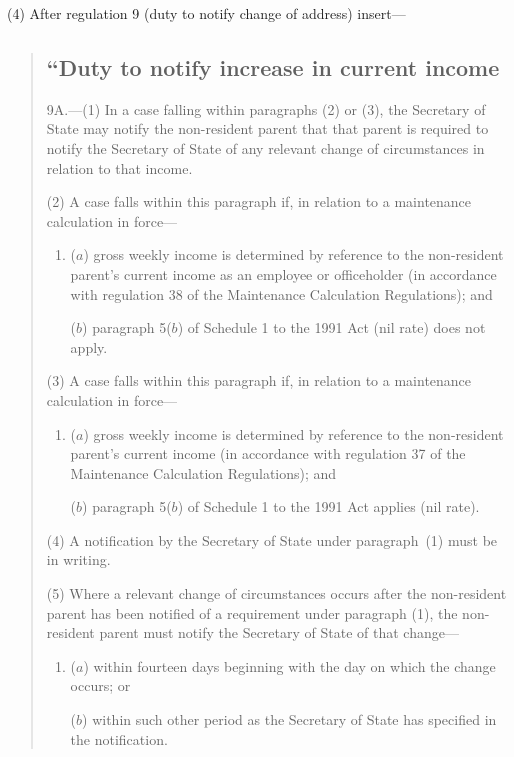 \documentclass[12pt,a4paper]{article}
\begin{document}
(4) After regulation 9 (duty to notify change of address) insert—
\begin{quotation}
\subsection*{“Duty to notify increase in current income}

9A.---(1)  In a case falling within paragraphs (2) or (3), the Secretary of State may notify the non-resident parent that that parent is required to notify the Secretary of State of any relevant change of circumstances in relation to that income.

(2) A case falls within this paragraph if, in relation to a maintenance calculation in force—
\begin{enumerate}\item[]
($a$) gross weekly income is determined by reference to the non-resident parent’s current income as an employee or officeholder (in accordance with regulation 38 of the Maintenance Calculation Regulations); and

($b$) paragraph 5($b$)  of Schedule 1 to the 1991 Act (nil rate) does not apply.
\end{enumerate}

(3) A case falls within this paragraph if, in relation to a maintenance calculation in force—
\begin{enumerate}\item[]
($a$) gross weekly income is determined by reference to the non-resident parent’s current income (in accordance with regulation 37 of the Maintenance Calculation Regulations); and

($b$) paragraph 5($b$)  of Schedule 1 to the 1991 Act applies (nil rate).
\end{enumerate}

(4) A notification by the Secretary of State under paragraph~(1) must be in writing.

(5) Where a relevant change of circumstances occurs after the non-resident parent has been notified of a requirement under paragraph (1), the non-resident parent must notify the Secretary of State of that change—
\begin{enumerate}\item[]
($a$) within fourteen days beginning with the day on which the change occurs; or

($b$) within such other period as the Secretary of State has specified in the notification.
\end{enumerate}


\end{quotation}
\end{document}
